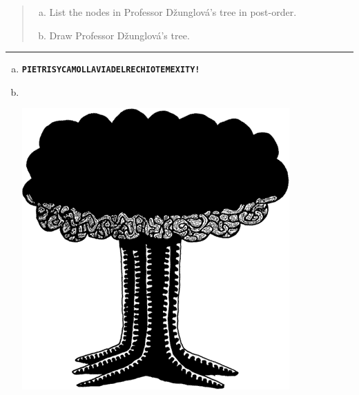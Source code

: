 \documentclass[11pt]{article}
\def\Sym#1{\textbf{\texttt{\color{BrickRed}#1}}}
\begin{document}



\begin{quote}
\begin{enumerate}[(a)]
\item
List the nodes in Professor Džunglová’s tree in post-order. 

\item
Draw Professor Džunglová’s tree.

\end{enumerate}
\end{quote}
\hrule



\begin{solution}
\begin{enumerate}[(a)]
\item 
\Sym{PIETRISYCAMOLLAVIADELRECHIOTEMEXITY!}

\item ~%

\begin{center}
\includegraphics[scale=0.5]{Fig/GranMaPa} %
\end{center}

\end{enumerate}
\end{solution}




\end{document}
